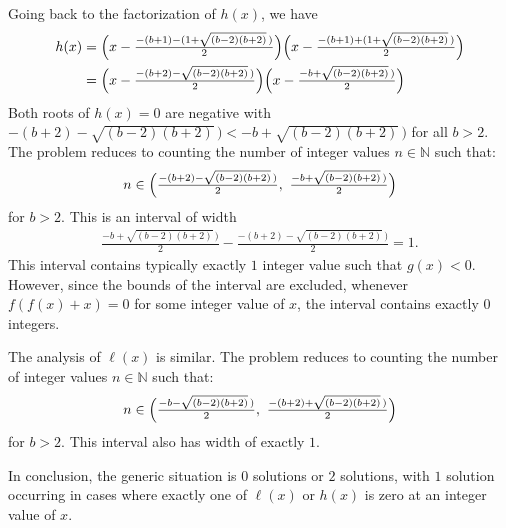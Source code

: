 Going back to the factorization of $h(x)$, we have
\begin{align*}
h(x) 
& = \Bigl(x-\tfrac{-(b+1)-(1+\sqrt{(b-2)(b+2)}\,)}{2}\Bigr)
    \Bigl(x-\tfrac{-(b+1)+(1+\sqrt{(b-2)(b+2)}\,)}{2}\Bigr)
\\
& = \Bigl(x-\tfrac{-(b+2)-\sqrt{(b-2)(b+2)}\,)}{2}\Bigr)
    \Bigl(x-\tfrac{-b+\sqrt{(b-2)(b+2)}\,)}{2}\Bigr)
\end{align*}
Both roots of $h(x)=0$ are negative with $-(b+2)-\sqrt{(b-2)(b+2)}\,)<-b+\sqrt{(b-2)(b+2)}\,)$ for all $b>2$.
The problem reduces to counting the number of integer values $n\in\mathbb{N}$ such that:
\begin{align*}
n \in \Bigl(\tfrac{-(b+2)-\sqrt{(b-2)(b+2)}\,)}{2},\
            \tfrac{-b+\sqrt{(b-2)(b+2)}\,)}{2}
      \Bigr)
\end{align*}
for $b>2$. This is an interval of width
\begin{align*}
\tfrac{-b+\sqrt{(b-2)(b+2)}\,)}{2}-\tfrac{-(b+2)-\sqrt{(b-2)(b+2)}\,)}{2}=1.
\end{align*}
This interval contains typically exactly $1$ integer value such that $g(x)<0$. However, since the bounds of the interval are excluded, whenever $f(f(x)+x)=0$ for some integer value of $x$, the interval contains exactly $0$ integers. 

The analysis of $\ell(x)$ is similar. 
The problem reduces to counting the number of integer values $n\in\mathbb{N}$ such that:
\begin{align*}
n \in \Bigl(\tfrac{-b-\sqrt{(b-2)(b+2)}\,)}{2},\
            \tfrac{-(b+2)+\sqrt{(b-2)(b+2)}\,)}{2}
      \Bigr)
\end{align*}
for $b>2$. This interval also has width of exactly $1$.

In conclusion, the generic situation is $0$ solutions or $2$ solutions, with $1$ solution occurring in cases where exactly one of $\ell(x)$ or $h(x)$ is zero at an integer value of $x$.


